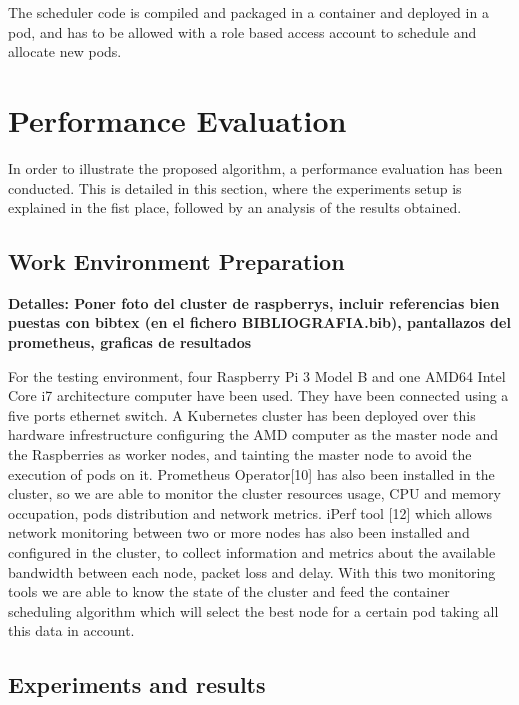 \documentclass[conference]{IEEEtran}
\begin{document}
The scheduler code is compiled and packaged in a container and deployed in a pod, and has to be allowed with a role based access account to schedule
and allocate new pods.


\section{Performance Evaluation}\label{sec:eval}

In order to illustrate the proposed algorithm, a performance evaluation has been conducted. This is detailed in this section, where the experiments setup is explained in the fist place, followed by an analysis of the results obtained. 


\subsection{Work Environment Preparation}\label{sec:env}


\textbf{Detalles: Poner foto del cluster de raspberrys, incluir referencias bien puestas con bibtex (en el fichero BIBLIOGRAFIA.bib), pantallazos del prometheus, graficas de resultados}

For the testing environment, four Raspberry Pi 3 Model B and one AMD64 Intel Core i7 architecture computer have been used. They have been connected using a five ports ethernet switch. A Kubernetes cluster has been deployed over this hardware infrestructure configuring the AMD computer as the master node and
the Raspberries as worker nodes, and tainting the master node to avoid the execution of pods on it. Prometheus Operator[10] 
has also been installed in the cluster, so we are able to monitor the cluster resources usage, CPU and memory occupation, pods distribution and network metrics.
iPerf tool [12] which allows network monitoring between two or more nodes has also been installed and configured in the cluster, to collect information and metrics
about the available bandwidth between each node, packet loss and delay. With this two monitoring tools we are able to know the state of the cluster and feed the
container scheduling algorithm which will select the best node for a certain pod taking all this data in account.



\subsection{Experiments and results}\label{sec:expe}
\end{document}
